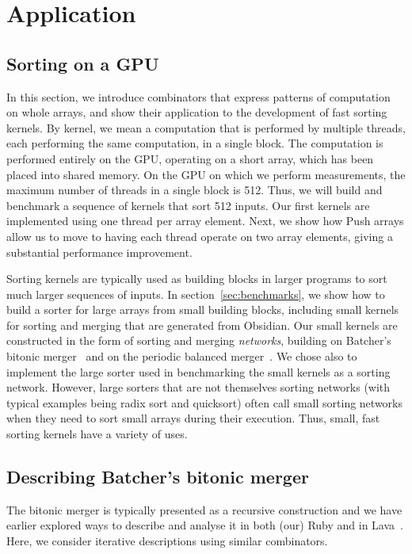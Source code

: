 \section{Application}
\label{sec:MARY}

\subsection{Sorting on a GPU}
In this section, we introduce combinators that express patterns
of computation on whole arrays, and show their application to the
development of fast sorting kernels.
By kernel, we mean a computation that is performed by multiple
threads, each performing the same computation, in a single block.
The computation is performed entirely on the GPU, operating on
a short array, which has been placed into shared memory.
On the GPU on which we perform measurements, the maximum number
of threads in a single block is 512. Thus, we will build and benchmark
a sequence of
kernels that sort 512 inputs.
Our first kernels are implemented using one thread per array element.
Next, we show how Push arrays allow us to move to having each
thread operate on two array elements, giving a substantial performance
improvement.

Sorting kernels are typically used as building blocks in larger
programs to sort much larger sequences of inputs. In section~\ref{sec:benchmarks},
we show how to build a sorter for large arrays from small building blocks, including
small kernels for sorting and merging that are generated from Obsidian.
Our small kernels are constructed in the form of sorting and merging {\em networks},
building on Batcher's bitonic merger~\cite{Batcher} and
on the periodic balanced merger~\cite{PeriodicBalanced}.
We chose also to implement the large sorter used  in benchmarking the
small kernels as a sorting network. However, large
sorters that are not themselves sorting networks (with typical examples being radix sort and quicksort) often call small sorting networks when they need to sort small arrays during their execution.
Thus, small, fast sorting kernels have a variety of uses.

\subsection{Describing Batcher's bitonic merger}

The bitonic merger is typically presented as a recursive
construction and we have earlier explored ways to describe
and analyse it in both (our) Ruby and in Lava~\cite{sortsRuby,LavaSorter}.
Here, we consider iterative descriptions using similar combinators.

